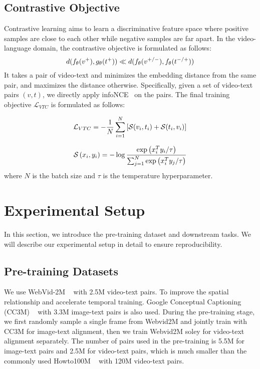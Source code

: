 \documentclass[10pt,twocolumn,letterpaper]{article}
\begin{document}
\vspace{-1mm}\subsection{Contrastive Objective}\vspace{-1mm}
\label{sec:contrastive objective}
Contrastive learning aims to learn a discriminative feature space where positive samples are close to each other while negative samples are far apart. In the video-language domain, the contrastive objective is formulated as follows:
\begin{equation}
\small
    d(f_\theta (v^+), g_\theta(t^+)) \ll d(f_\theta (v^{+/-}), f_\theta(t^{-/+}))
\end{equation}
It takes a pair of video-text and minimizes the embedding distance from the same pair, and maximizes the distance otherwise. Specifically, given a set of video-text pairs $(v,t)$, we directly apply infoNCE~\cite{cpc_infonce} on the pairs. The final training objective $\mathcal{L}_{V T C}$ is formulated as follows:

\begin{equation}
\small
\mathcal{L}_{V T C}=-\frac{1}{N}\sum_{i=1}^{N}\left[\mathcal{S}(v_i, t_i)+\mathcal{S}(t_i, v_i)\right]
\end{equation}

\begin{equation}
\small
\mathcal{S}\left(x_i, y_i\right)=-\log \frac{\exp \left(x_i^T y_i / \tau\right)} {\sum_{j=1}^N \exp \left(x_i^T y_j / \tau\right)}
\end{equation}
where $N$ is the batch size and $ \tau$ is the temperature hyperparameter.

\vspace{-1mm}\section{Experimental Setup}
In this section, we introduce the pre-training dataset and downstream tasks. We will describe our experimental setup in detail to ensure reproducibility.

\vspace{-1mm}\subsection{Pre-training Datasets}

We use WebVid-2M ~\cite{Frozen} with 2.5M video-text pairs. To improve the spatial relationship and accelerate temporal training. Google Conceptual Captioning (CC3M) ~\cite{cc3m} with 3.3M image-text pairs is also used. During the pre-training stage, we first randomly sample a single frame from Webvid2M and jointly train with CC3M for image-text alignment, then we train Webvid2M soley for video-text alignment separately. The number of pairs used in the pre-training is 5.5M for image-text pairs and 2.5M for video-text pairs, which is much smaller than the commonly used Howto100M ~\cite{howto100m} with 120M video-text pairs.  
\end{document}
